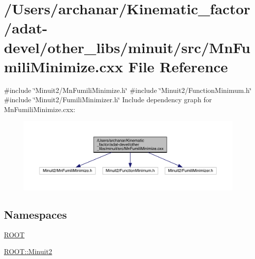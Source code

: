 \hypertarget{adat-devel_2other__libs_2minuit_2src_2MnFumiliMinimize_8cxx}{}\section{/\+Users/archanar/\+Kinematic\+\_\+factor/adat-\/devel/other\+\_\+libs/minuit/src/\+Mn\+Fumili\+Minimize.cxx File Reference}
\label{adat-devel_2other__libs_2minuit_2src_2MnFumiliMinimize_8cxx}
{\ttfamily \#include \char`\"{}Minuit2/\+Mn\+Fumili\+Minimize.\+h\char`\"{}}\newline
{\ttfamily \#include \char`\"{}Minuit2/\+Function\+Minimum.\+h\char`\"{}}\newline
{\ttfamily \#include \char`\"{}Minuit2/\+Fumili\+Minimizer.\+h\char`\"{}}\newline
Include dependency graph for Mn\+Fumili\+Minimize.\+cxx\+:
\nopagebreak
\begin{figure}[H]
\begin{center}
\leavevmode
\includegraphics[width=350pt]{d4/d3c/adat-devel_2other__libs_2minuit_2src_2MnFumiliMinimize_8cxx__incl}
\end{center}
\end{figure}
\subsection*{Namespaces}
\begin{DoxyCompactItemize}
\item 
 \mbox{\hyperlink{namespaceROOT}{R\+O\+OT}}
\item 
 \mbox{\hyperlink{namespaceROOT_1_1Minuit2}{R\+O\+O\+T\+::\+Minuit2}}
\end{DoxyCompactItemize}
